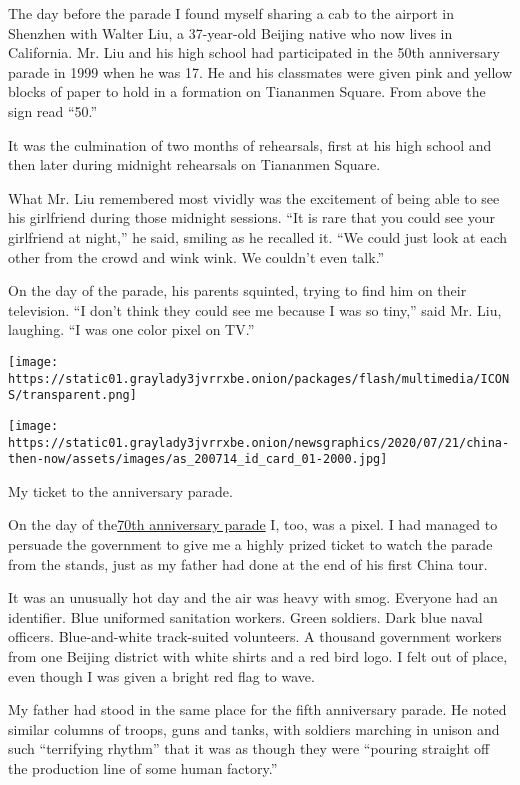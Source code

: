 The day before the parade I found myself sharing a cab to the airport in
Shenzhen with Walter Liu, a 37-year-old Beijing native who now lives in
California. Mr. Liu and his high school had participated in the 50th
anniversary parade in 1999 when he was 17. He and his classmates were
given pink and yellow blocks of paper to hold in a formation on
Tiananmen Square. From above the sign read ``50.''

It was the culmination of two months of rehearsals, first at his high
school and then later during midnight rehearsals on Tiananmen Square.

What Mr. Liu remembered most vividly was the excitement of being able to
see his girlfriend during those midnight sessions. ``It is rare that you
could see your girlfriend at night,'' he said, smiling as he recalled
it. ``We could just look at each other from the crowd and wink wink. We
couldn't even talk.''

On the day of the parade, his parents squinted, trying to find him on
their television. ``I don't think they could see me because I was so
tiny,'' said Mr. Liu, laughing. ``I was one color pixel on TV.''

\texttt{[image: https://static01.graylady3jvrrxbe.onion/packages/flash/multimedia/ICONS/transparent.png]}

\texttt{[image: https://static01.graylady3jvrrxbe.onion/newsgraphics/2020/07/21/china-then-now/assets/images/as\_200714\_id\_card\_01-2000.jpg]}

My ticket to the anniversary parade.

On the day of
the\href{https://www.nytimes3xbfgragh.onion/2019/09/28/world/asia/china-national-day-70th-anniversary.html}{}\href{https://www.nytimes3xbfgragh.onion/2019/09/28/world/asia/china-national-day-70th-anniversary.html}{70th
anniversary parade} I, too, was a pixel. I had managed to persuade the
government to give me a highly prized ticket to watch the parade from
the stands, just as my father had done at the end of his first China
tour.

It was an unusually hot day and the air was heavy with smog. Everyone
had an identifier. Blue uniformed sanitation workers. Green soldiers.
Dark blue naval officers. Blue-and-white track-suited volunteers. A
thousand government workers from one Beijing district with white shirts
and a red bird logo. I felt out of place, even though I was given a
bright red flag to wave.

My father had stood in the same place for the fifth anniversary parade.
He noted similar columns of troops, guns and tanks, with soldiers
marching in unison and such ``terrifying rhythm'' that it was as though
they were ``pouring straight off the production line of some human
factory.''

